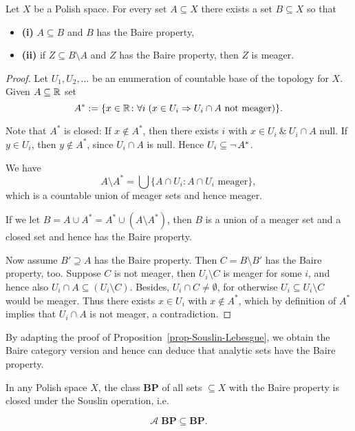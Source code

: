 \begin{lemma}\label{lem-approx-category}Let $X$ be a Polish space. For every set $A \subseteq X$ there exists a set $B \subseteq X$ so that

\begin{itemize}
\item \textbf{(i)} $A \subseteq B$ and $B$  has the Baire property,
\item \textbf{(ii)} if $Z \subseteq B \setminus A$  and $Z$ has the Baire
property, then $Z$ is meager.
\end{itemize}

\end{lemma}\begin{proof}Let  $U_1, U_2, \ldots$ be an enumeration of countable base of the
topology for $X$.
Given $A \subseteq \mathbb{R}$ set
\begin{equation*}
A^*:= \{x \in \mathbb{R} \colon \forall i \; ( x \in U_i \Rightarrow U_i \cap A \text{ not meager)}\}.
\end{equation*}

Note that $A^*$ is closed: If $x \not \in A^*$, then there exists $i$ with $x \in U_i \: \& \: U_i \cap A$ null. If $y \in U_i$, then $y \not \in A^*$, since $U_i \cap A$ is null.
Hence $U_i \subseteq \neg \, A^*$.

We have
\begin{equation*}
A \setminus A^* = \bigcup \{A \cap U_i \colon A \cap U_i \text{ meager}\},
\end{equation*}
which is a countable union of meager sets and hence meager.

If we let $B = A \cup A^* = A^* \cup (A \setminus A^*)$, then $B$ is a
union of a meager set and a closed set and hence has the Baire
property.

Now assume $B' \supseteq A$ has the Baire property. Then $C= B
\setminus B'$ has the Baire property, too. Suppose $C$ is not meager,
then $U_i \setminus C$ is meager for some $i$, and hence also $U_i
\cap A \subseteq (U_i \setminus C)$. Besides, $U_i \cap C \neq
\emptyset$, for otherwise $U_i \subseteq U_i \setminus C$ would be
meager. Thus there exists $x \in U_i$ with $x \not\in A^*$, which by
definition of $A^*$ implies that $U_i \cap A$ is not meager, a contradiction.

\end{proof}By adapting the proof of Proposition~\ref{prop-Souslin-Lebesgue}, we
obtain the Baire category version and hence can deduce that analytic sets
have the Baire property.

\begin{proposition}\label{prop-souslin-baire}In any Polish space $X$, the class $\mathbf{BP}$ of all sets $\subseteq X$
with the Baire property is closed under the Souslin operation, i.e.

\begin{equation}
\mathcal{A} \; \mathbf{BP} \subseteq  \mathbf{BP}.
\end{equation}

\end{proposition}